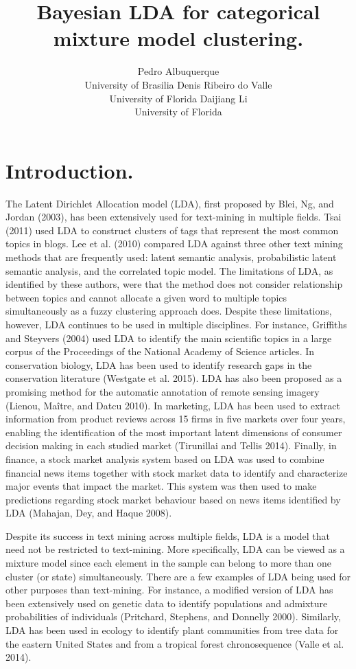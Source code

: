 \documentclass[article]{jss}
\author{
Pedro Albuquerque\\University of Brasilia \And Denis Ribeiro do Valle\\University of Florida \And Daijiang Li\\University of Florida
}
\title{Bayesian LDA for categorical mixture model clustering.}
\begin{document}
\section{Introduction.}\label{introduction.}

The Latent Dirichlet Allocation model (LDA), first proposed by Blei, Ng,
and Jordan (2003), has been extensively used for text-mining in multiple
fields. Tsai (2011) used LDA to construct clusters of tags that
represent the most common topics in blogs. Lee et al. (2010) compared
LDA against three other text mining methods that are frequently used:
latent semantic analysis, probabilistic latent semantic analysis, and
the correlated topic model. The limitations of LDA, as identified by
these authors, were that the method does not consider relationship
between topics and cannot allocate a given word to multiple topics
simultaneously as a fuzzy clustering approach does. Despite these
limitations, however, LDA continues to be used in multiple disciplines.
For instance, Griffiths and Steyvers (2004) used LDA to identify the
main scientific topics in a large corpus of the Proceedings of the
National Academy of Science articles. In conservation biology, LDA has
been used to identify research gaps in the conservation literature
(Westgate et al. 2015). LDA has also been proposed as a promising method
for the automatic annotation of remote sensing imagery (Lienou, Maître,
and Datcu 2010). In marketing, LDA has been used to extract information
from product reviews across 15 firms in five markets over four years,
enabling the identification of the most important latent dimensions of
consumer decision making in each studied market (Tirunillai and Tellis
2014). Finally, in finance, a stock market analysis system based on LDA
was used to combine financial news items together with stock market data
to identify and characterize major events that impact the market. This
system was then used to make predictions regarding stock market
behaviour based on news items identified by LDA (Mahajan, Dey, and Haque
2008).

Despite its success in text mining across multiple fields, LDA is a
model that need not be restricted to text-mining. More specifically, LDA
can be viewed as a mixture model since each element in the sample can
belong to more than one cluster (or state) simultaneously. There are a
few examples of LDA being used for other purposes than text-mining. For
instance, a modified version of LDA has been extensively used on genetic
data to identify populations and admixture probabilities of individuals
(Pritchard, Stephens, and Donnelly 2000). Similarly, LDA has been used
in ecology to identify plant communities from tree data for the eastern
United States and from a tropical forest chronosequence (Valle et al.
2014).
\end{document}
